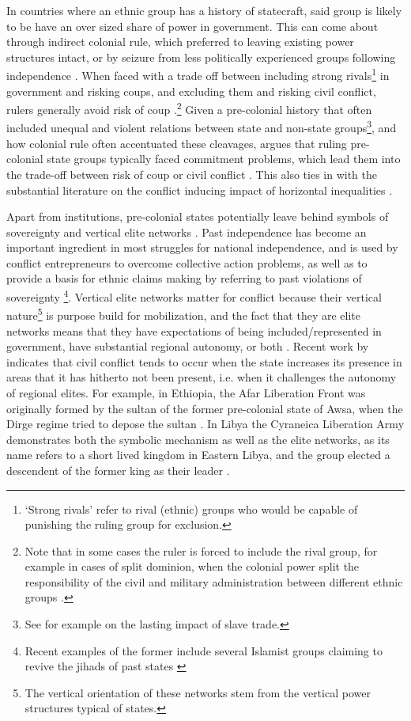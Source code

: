 \documentclass[12pt]{article}
\begin{document}
In countries where an ethnic group has a history of statecraft, said group is
likely to be have an over sized share of power in government. This can come
about through indirect colonial rule, which preferred to leaving existing power
structures intact, or by seizure from less politically experienced groups
following independence \citep{Paine2019}. When faced with a trade off between
including strong rivals\footnote{`Strong rivals' refer to rival (ethnic) groups
who would be capable of punishing the ruling group for exclusion.} in government
and risking coups, and excluding them and risking civil conflict, rulers
generally avoid risk of coup \citep{Paine2019, Powell_2014,
	Roessler_2011}.\footnote{Note that in some cases the ruler is forced to
include the rival group, for example in cases of split dominion, when the
colonial power split the responsibility of the civil and military administration
between different ethnic groups \citep{Paine2019}.} Given a pre-colonial history
that often included unequal and violent relations between state and non-state
groups\footnote{See for example \citet{Nunn2008} on the lasting impact of slave
trade.}, and how colonial rule often accentuated these cleavages,
\citet{Paine2019} argues that ruling pre-colonial state groups typically faced
commitment problems, which lead them into the trade-off between risk of coup or
civil conflict \citep{Paine2019}. This also ties in with the substantial
literature on the conflict inducing impact of horizontal inequalities
\citep{CEDERMAN_2011}.

Apart from institutions, pre-colonial states potentially leave behind symbols of
sovereignty and vertical elite networks \citep{Wishman}. Past independence has
become an important ingredient in most struggles for national independence, and
is used by conflict entrepreneurs to overcome collective action problems, as
well as to provide a basis for ethnic claims making by referring to past
violations of sovereignty \citep{Ahram2019, Shelef2016}\footnote{Recent examples
	of the former include several Islamist groups claiming to revive the
	jihads of past states \citep{Zenn2015}}. Vertical elite networks matter
	for conflict because their vertical nature\footnote{The vertical
		orientation of these networks stem from the vertical power
	structures typical of states.} is purpose build for mobilization, and
	the fact that they are elite networks means that they have expectations
	of being included/represented in government, have substantial regional
	autonomy, or both \citep{Wishman}. Recent work by \citet{Ying_2020}
	indicates that civil conflict tends to occur when the state increases
	its presence in areas that it has hitherto not been present, i.e. when
	it challenges the autonomy of regional elites. For example, in Ethiopia,
	the Afar Liberation Front was originally formed by the sultan of the
	former pre-colonial state of Awsa, when the Dirge regime tried to depose
	the sultan \citep{Shehim1985, Hanfare2011}.  In Libya the Cyraneica
	Liberation Army demonstrates both the symbolic mechanism as well as the
	elite networks, as its name refers to a short lived kingdom in Eastern
	Libya, and the group elected a descendent of the former king as their
	leader \citep{Ahram2019}.
\end{document}
